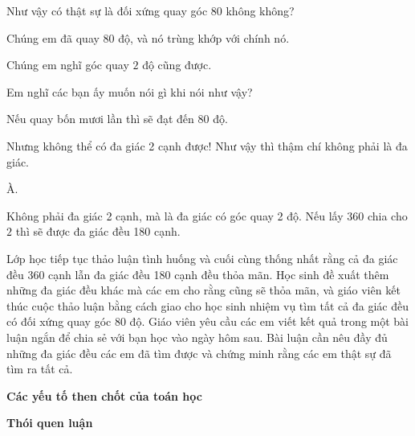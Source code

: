 {\begin{scriptlist}
      \item [Giáo viên:] Như vậy có thật sự là đối xứng quay góc 80 không không?

      \item [Học sinh 3:] Chúng em đã quay $80$ độ, và nó trùng khớp với chính nó.

      \item [Học sinh 4:] Chúng em nghĩ góc quay $2$ độ cũng được.

      \item [Giáo viên:] Em nghĩ các bạn ấy muốn nói gì khi nói như vậy?

      \item [Học sinh 4:] Nếu quay bốn mươi lần thì sẽ đạt đến $80$ độ.

      \item [Học sinh 5:] Nhưng không thể có đa giác 2 cạnh được! Như vậy thì thậm chí không phải là đa giác.

      \item [Học sinh 4:] À.

      \item [Học sinh 6:] Không phải đa giác 2 cạnh, mà là đa giác có góc quay 2 độ. Nếu lấy $360$ chia cho $2$ thì sẽ được đa giác đều 180 cạnh.
    \end{scriptlist}

    Lớp học tiếp tục thảo luận tình huống và cuối cùng thống nhất rằng cả đa giác đều 360 cạnh lẫn đa giác đều 180 cạnh đều thỏa mãn. Học sinh đề xuất thêm những đa giác đều khác mà các em cho rằng cũng sẽ thỏa mãn, và giáo viên kết thúc cuộc thảo luận bằng cách giao cho học sinh nhiệm vụ tìm tất cả đa giác đều có đối xứng quay góc 80 độ. Giáo viên yêu cầu các em viết kết quả trong một bài luận ngắn để chia sẻ với bạn học vào ngày hôm sau. Bài luận cần nêu đầy đủ những đa giác đều các em đã tìm được và chứng minh rằng các em thật sự đã tìm ra tất cả.

    \textbf{Các yếu tố then chốt của toán học}

    \begin{hanglist}
    \end{hanglist}

    \textbf{Thói quen luận}

    \begin{hanglist}


    \end{hanglist}
  }{}

